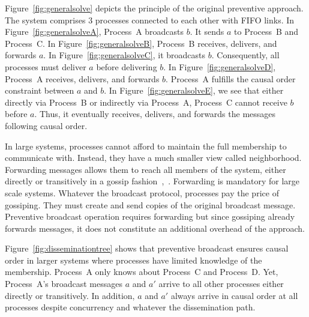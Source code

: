 Figure~\ref{fig:generalsolve} depicts the principle of the original preventive
approach. The system comprises 3 processes connected to each other with FIFO
links.  In Figure~\ref{fig:generalsolveA}, Process~A broadcasts $b$. It sends
$a$ to Process~B and Process~C. In Figure~\ref{fig:generalsolveB}, Process~B
receives, delivers, and forwards $a$. In Figure~\ref{fig:generalsolveC}, it
broadcasts $b$. Consequently, all processes must deliver $a$ before delivering
$b$. In Figure~\ref{fig:generalsolveD}, Process~A receives, delivers, and
forwards $b$. Process~A fulfills the causal order constraint between $a$ and
$b$. In Figure~\ref{fig:generalsolveE}, we see that either directly via
Process~B or indirectly via Process~A, Process~C cannot receive $b$ before
$a$. Thus, it eventually receives, delivers, and forwards the messages following
causal order.


In large systems, processes cannot afford to maintain the full membership to
communicate with. Instead, they have a much smaller view called
neighborhood. Forwarding messages allows them to reach all members of the
system, either directly or transitively in a gossip
fashion~\cite{demers1987epidemic},~\cite{birman1999bimodal}. Forwarding is mandatory for
large scale systems.  Whatever the broadcast protocol, processes pay the price
of gossiping. They must create and send copies of the original broadcast
message. Preventive broadcast operation requires forwarding but since gossiping
already forwards messages, it does not constitute an additional overhead of the
approach.

Figure~\ref{fig:disseminationtree} shows that preventive broadcast ensures
causal order in larger systems where processes have limited knowledge of
the membership.  Process~A only knows about Process~C and Process~D.  Yet,
Process~A's broadcast messages $a$ and $a'$ arrive to all other processes either
directly or transitively. In addition, $a$ and $a'$ always arrive in causal
order at all processes despite concurrency and whatever the dissemination path.


